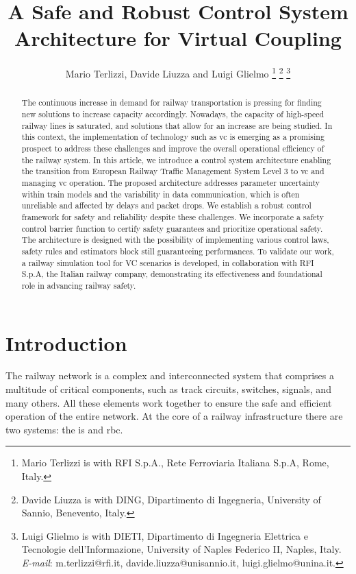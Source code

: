\documentclass[letterpaper, 10 pt, conference]{ieeeconf}
\title{\LARGE \bf \centering
A Safe and Robust Control System Architecture for Virtual Coupling 
}
\author{Mario Terlizzi, Davide Liuzza and Luigi Glielmo%
\thanks{Mario Terlizzi is with RFI S.p.A., Rete Ferroviaria Italiana S.p.A, 
Rome, Italy.}
\thanks{Davide Liuzza is with DING, Dipartimento di Ingegneria, University of Sannio, Benevento, Italy.}
\thanks{Luigi Glielmo is with DIETI, Dipartimento di Ingegneria Elettrica e Tecnologie dell'Informazione, University of Naples Federico II, Naples, Italy.
{\textit{E-mail}:} m.terlizzi@rfi.it, davide.liuzza@unisannio.it, luigi.glielmo@unina.it. }}%
\theoremstyle{definition}
\theoremstyle{nopoint}
\begin{document}
\maketitle
\thispagestyle{empty}
\pagestyle{empty}
\begin{abstract}
The continuous increase in demand for railway transportation is pressing for finding new solutions to increase capacity accordingly. Nowadays, the capacity of high-speed railway lines is saturated, and solutions that allow for an increase are being studied. In this context, the implementation of technology such as \gls{vc} is emerging as a promising prospect to address these challenges and improve the overall operational efficiency of the railway system. In this article, we introduce a control system architecture enabling the transition from European Railway Traffic Management System Level 3 to \gls{vc} and managing \gls{vc} operation. The proposed architecture addresses parameter uncertainty within train models and the variability in data communication, which is often unreliable and affected by delays and packet drops. We establish a robust control framework for safety and reliability despite these challenges. We incorporate a safety control barrier function to certify safety guarantees and prioritize operational safety. The architecture is designed with the possibility of implementing various control laws, safety rules and estimators block still guaranteeing performances. To validate our work, a railway simulation tool for VC scenarios is developed, in collaboration with RFI S.p.A, the Italian railway company, demonstrating its effectiveness and foundational role in advancing railway safety.
\end{abstract}



\section{Introduction}
%


The railway network is a complex and interconnected system that comprises a multitude of critical components, such as track circuits, switches, signals, and many others. All these elements work together to ensure the safe and efficient operation of the entire network. At the core of a railway infrastructure there are two systems: the \gls{is} and \gls{rbc}.
\end{document}
